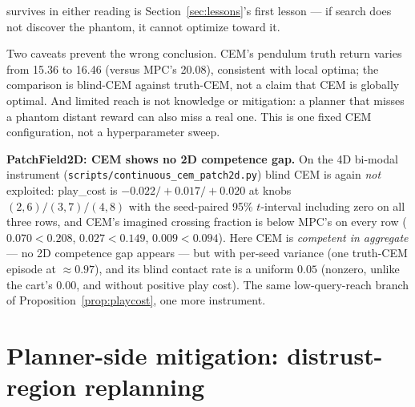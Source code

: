 \documentclass[11pt]{article}
\theoremstyle{definition}
\theoremstyle{remark}
\begin{document}
survives in either reading is Section~\ref{sec:lessons}'s first lesson --- if search does not discover the phantom, it cannot optimize toward it.

Two caveats prevent the wrong conclusion. CEM's pendulum truth return varies from 15.36 to 16.46 (versus MPC's 20.08), consistent with local optima; the comparison is blind-CEM against truth-CEM, not a claim that CEM is globally optimal. And limited reach is not knowledge or mitigation: a planner that misses a phantom distant reward can also miss a real one. This is one fixed CEM configuration, not a hyperparameter sweep.

\textbf{PatchField2D: CEM shows no 2D competence gap.} On the 4D bi-modal instrument (\texttt{scripts/continuous\_cem\_patch2d.py}) blind CEM is again \emph{not} exploited: play\_cost is $-0.022 / {+}0.017 / {+}0.020$ at knobs $(2,6)/(3,7)/(4,8)$ with the seed-paired 95\% $t$-interval including zero on all three rows, and CEM's imagined crossing fraction is below MPC's on every row ($0.070 < 0.208$, $0.027 < 0.149$, $0.009 < 0.094$). Here CEM is \emph{competent in aggregate} --- no 2D competence gap appears --- but with per-seed variance (one truth-CEM episode at $\approx 0.97$), and its blind contact rate is a uniform $0.05$ (nonzero, unlike the cart's $0.00$, and without positive play cost). The same low-query-reach branch of Proposition~\ref{prop:playcost}, one more instrument.


\section{Planner-side mitigation: distrust-region replanning}
\label{sup:mitigation}
\end{document}
